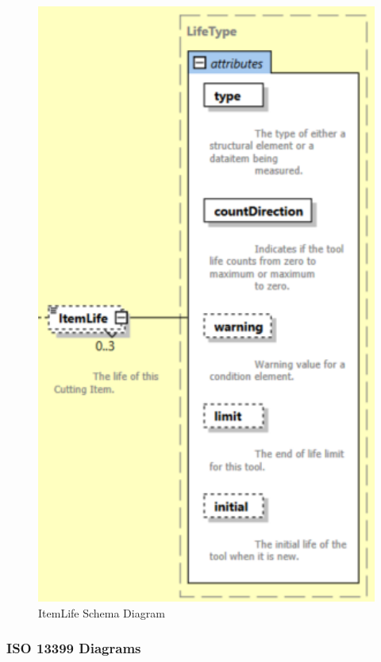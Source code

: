 \FloatBarrier


\begin{figure}[ht]
  \centering
    \includegraphics[width=1.0\textwidth]{figures/ItemLife Schema.png}
  \caption{ItemLife Schema Diagram}
  \label{fig:ItemLife Schema Diagram}
\end{figure}

\FloatBarrier


\subsubsection{ISO 13399 Diagrams}
\label{sec:ISO 13399 Diagrams}

